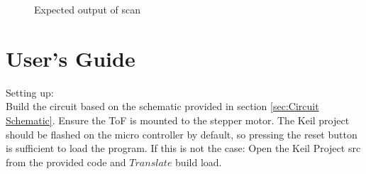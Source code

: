 \documentclass[12pt, letterpaper]{article}
\begin{document}
\begin{figure}[htbp]
\centering
{}
\hfill
{}
\caption{Expected output of scan}
\label{fig:scan}
\end{figure}
 \newpage
\section{User's Guide}
Setting up: \\
Build the circuit based on the schematic provided in section \ref{sec:Circuit Schematic}. Ensure the ToF is mounted to the stepper motor. The Keil project should be flashed on the micro controller by default, so pressing the reset button is sufficient to load the program. If this is not the case: Open the Keil Project src from the provided code and $Translate$ \rightarrow build \rightarrow load. \\
\end{document}

